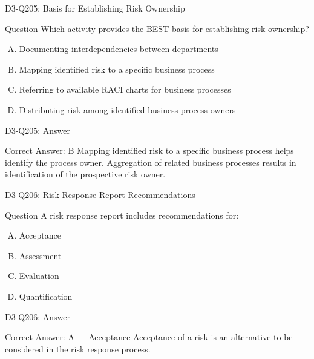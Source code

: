 \documentclass{beamer}
\begin{document}
	\begin{frame}{D3-Q205: Basis for Establishing Risk Ownership}
		\begin{block}{Question}
			Which activity provides the BEST basis for establishing risk ownership?
		\end{block}
		\begin{enumerate}[(A)]
			\item Documenting interdependencies between departments
			\item Mapping identified risk to a specific business process
			\item Referring to available RACI charts for business processes
			\item Distributing risk among identified business process owners
		\end{enumerate}
	\end{frame}
	\begin{frame}{D3-Q205: Answer}
		\begin{block}{Correct Answer: B}
			Mapping identified risk to a specific business process helps identify the process owner. Aggregation of related business processes results in identification of the prospective risk owner.
		\end{block}
	\end{frame}
	
	\begin{frame}{D3-Q206: Risk Response Report Recommendations}
		\begin{block}{Question}
			A risk response report includes recommendations for:
		\end{block}
		\begin{enumerate}[(A)]
			\item Acceptance
			\item Assessment
			\item Evaluation
			\item Quantification
		\end{enumerate}
	\end{frame}
	\begin{frame}{D3-Q206: Answer}
		\begin{block}{Correct Answer: A --- Acceptance}
			Acceptance of a risk is an alternative to be considered in the risk response process.
		\end{block}
	\end{frame}
	
\end{document}
